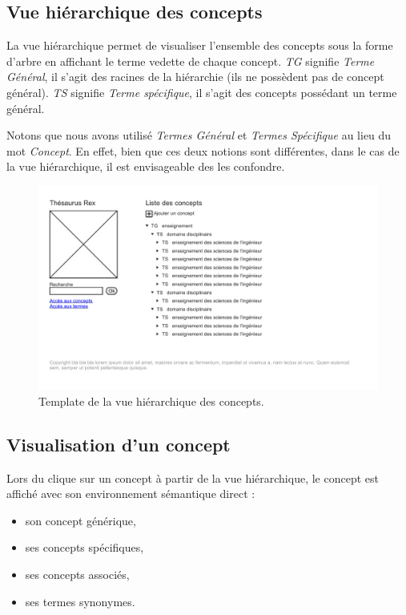 \subsection{Vue hiérarchique des concepts}

La vue hiérarchique permet de visualiser l'ensemble des concepts sous la forme d'arbre en affichant le terme vedette de chaque concept. \emph{TG} signifie \emph{Terme Général},  il s'agit des racines de la hiérarchie (ils ne possèdent pas de concept général). \emph{TS} signifie \emph{Terme spécifique}, il s'agit des concepts possédant un terme général.

Notons que nous avons utilisé \emph{Termes Général} et \emph{Termes Spécifique} au lieu du mot \emph{Concept}. En effet, bien que ces deux notions sont différentes, dans le cas de la vue hiérarchique, il est envisageable des les confondre.
\begin{figure}[H]
\begin{center}
\includegraphics[width=\textwidth]{files/template_concepts}
\end{center}
\caption{Template de la vue hiérarchique des concepts.}
\end{figure}

\subsection{Visualisation d'un concept}

Lors du clique sur un concept à partir de la vue hiérarchique, le concept est affiché avec son environnement sémantique direct :
\begin{itemize}
\item son concept générique,
\item ses concepts spécifiques,
\item ses concepts associés,
\item ses termes synonymes.
\end{itemize}


